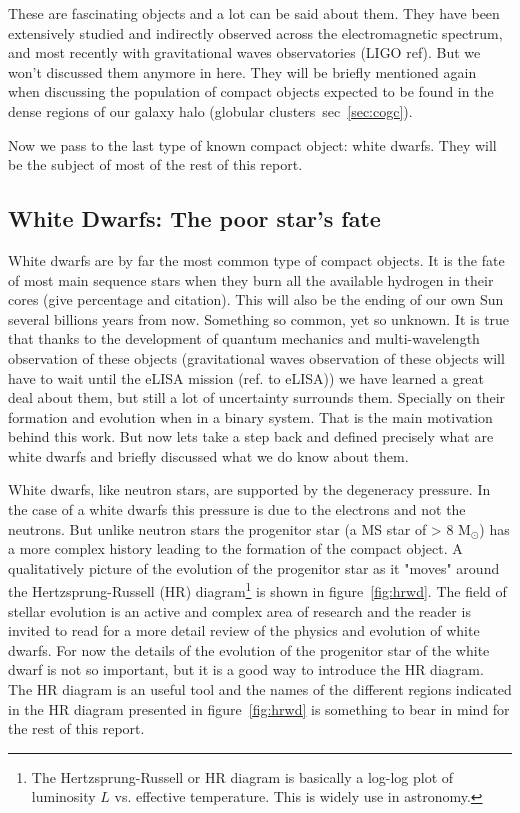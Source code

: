 These are fascinating objects and a lot can be said about them. They have been extensively studied and indirectly observed across the electromagnetic spectrum, and most recently with gravitational waves observatories (LIGO ref). But we won't discussed them anymore in here. They will be briefly mentioned again when discussing the population of compact objects expected to be found in the dense regions of our galaxy halo (globular clusters~sec~\ref{sec:cogc}). 

Now we pass to the last type of known compact object: white dwarfs. They will be the subject of most of the rest of this report. 

\subsection[White Dwarfs]{White Dwarfs: The poor star's fate}\label{sec:wd} 

White dwarfs are by far the most common type of compact objects. It is the fate of most main sequence stars when they burn all the available hydrogen in their cores (give percentage and citation). This will also be the ending of our own Sun several billions years from now. Something so common, yet so unknown. It is true that thanks to the development of quantum mechanics and multi-wavelength observation of these objects (gravitational waves observation of these objects will have to wait until the eLISA mission (ref. to eLISA\cite{a})) we have learned a great deal about them, but still a lot of uncertainty surrounds them. Specially on their formation and evolution when in a binary system. That is the main motivation behind this work. But now lets take a step back and defined precisely what are white dwarfs and briefly discussed what we do know about them. 

White dwarfs, like neutron stars, are supported by the degeneracy pressure. In the case of a white dwarfs this pressure is due to the electrons and not the neutrons. But unlike neutron stars the progenitor star (a MS star of > 8 M$_\odot$) has a more complex history leading to the formation of the compact object. A qualitatively picture of the evolution of the progenitor star as it "moves" around the Hertzsprung-Russell (HR) diagram\footnote{ The Hertzsprung-Russell or HR diagram is basically a log-log plot of luminosity $L$ vs. effective temperature. This is widely use in astronomy.} is shown in figure~\ref{fig:hrwd}. The field of stellar evolution is an active and complex area of research and the reader is invited to read \cite{koester_physics_1990} for a more detail review of the physics and evolution of white dwarfs. For now the details of the evolution of the progenitor star of the white dwarf is not so important, but it is a good way to introduce the HR diagram. The HR diagram is an useful tool and the names of the different regions indicated in the HR diagram presented in figure~\ref{fig:hrwd} is something to bear in mind for the rest of this report.  

